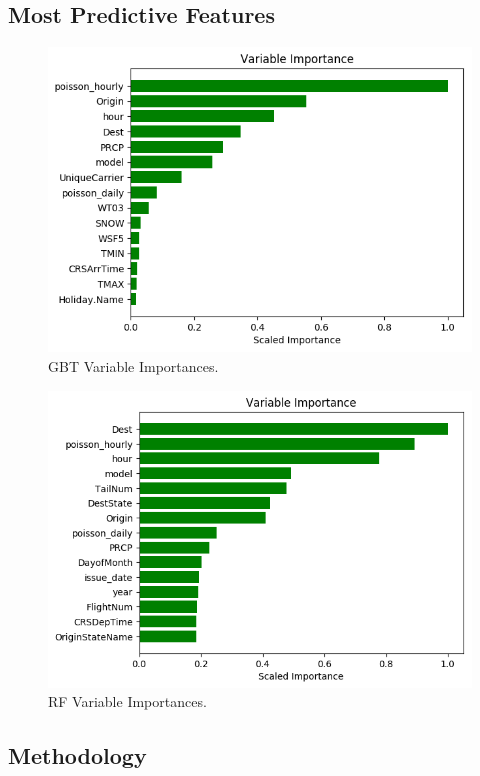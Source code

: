 \documentclass[twocolumn,showpacs,%
  nofootinbib,aps,superscriptaddress,%
  eqsecnum,prd,notitlepage,showkeys,10pt]{revtex4-1}
\begin{document}
\subsection{Most Predictive Features}


\begin{figure}
\includegraphics[scale=0.5]{gb_variables}
\caption{\label{fig:GB}GBT Variable Importances.}
\end{figure}

\begin{figure}
\includegraphics[scale=0.5]{rf_variables}
\caption{\label{fig:RF}RF Variable Importances.}
\end{figure}


\subsection{Methodology}
\end{document}
